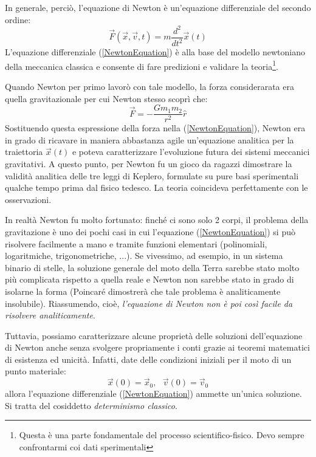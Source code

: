 \documentclass[a4paper,openany]{article}
\begin{document}
	In generale, perciò, l'equazione di Newton è un'equazione differenziale del secondo ordine:
	\begin{equation}
		\vec{F}(\vec{x},\vec{v},t) = m\dfrac{d^{2}}{dt^{2}}\vec{x}(t)
		\label{NewtonEquation}
	\end{equation}
	L'equazione differenziale (\ref{NewtonEquation}) è alla base del modello newtoniano della meccanica classica e consente di fare predizioni e validare la teoria\footnote{Questa è una parte fondamentale del processo scientifico-fisico. Devo sempre confrontarmi coi dati sperimentali}. 
	
	Quando Newton per primo lavorò con tale modello, la forza considerarata era quella gravitazionale per cui Newton stesso scoprì che:
	\begin{equation}
		\vec{F} = -\dfrac{G m_{1}m_{2}}{r^{2}}\hat{r}
		\label{GravitationLaw}
	\end{equation} 
	Sostituendo questa espressione della forza nella (\ref{NewtonEquation}), Newton era in grado di ricavare in maniera abbastanza agile un'equazione analitica per la traiettoria $\vec{x}(t)$ e poteva caratterizzare l'evoluzione futura dei sistemi meccanici gravitativi. A questo punto, per Newton fu un gioco da ragazzi dimostrare la validità analitica delle tre leggi di Keplero, formulate su pure basi sperimentali qualche tempo prima dal fisico tedesco. La teoria coincideva perfettamente con le osservazioni.
	
	In realtà Newton fu molto fortunato: finché ci sono solo 2 corpi, il problema della gravitazione è uno dei pochi casi in cui l'equazione (\ref{NewtonEquation}) si può risolvere facilmente a mano e tramite funzioni elementari (polinomiali, logaritmiche, trigonometriche, ...). Se vivessimo, ad esempio, in un sistema  binario di stelle, la soluzione generale del moto della Terra sarebbe stato molto più complicata rispetto a quella reale e Newton non sarebbe stato in grado di isolarne la forma (Poincaré dimostrerà che tale problema è analiticamente insolubile). Riassumendo, cioè, \textit{l'equazione di Newton non è poi così facile da risolvere analiticamente}.
	
	Tuttavia, possiamo caratterizzare alcune proprietà delle soluzioni dell'equazione di Newton anche senza svolgere propriamente i conti grazie ai teoremi matematici di esistenza ed unicità. Infatti, date delle condizioni iniziali per il moto di un punto materiale:
	$$
	\vec{x}(0) = \vec{x}_{0}, \mbox{      }
	\vec{v}(0) = \vec{v}_{0}
	$$
	allora l'equazione differenziale (\ref{NewtonEquation}) ammette un'unica soluzione. Si tratta del cosiddetto \textit{determinismo classico}.
	
\end{document}
